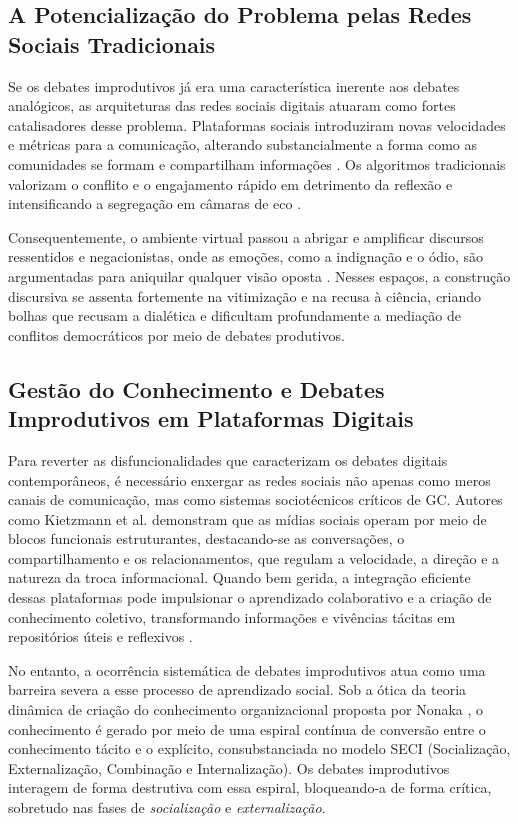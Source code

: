 \documentclass[conference]{IEEEtran} \IEEEoverridecommandlockouts %
\begin{document}
\subsection{A Potencialização do Problema pelas Redes Sociais Tradicionais}

Se os debates improdutivos já era uma característica inerente aos debates analógicos, as arquiteturas das redes sociais digitais atuaram como fortes catalisadores desse problema. Plataformas sociais introduziram novas velocidades e métricas para a comunicação, alterando substancialmente a forma como as comunidades se formam e compartilham informações \cite{kietzmannSocialMediaGet2011,schneider2026mitigating}. Os algoritmos tradicionais valorizam o conflito e o engajamento rápido em detrimento da reflexão e intensificando a segregação em câmaras de eco \cite{pimentelAgendaSolutionsMitigate2023}.

Consequentemente, o ambiente virtual passou a abrigar e amplificar discursos ressentidos e negacionistas, onde as emoções, como a indignação e o ódio, são argumentadas para aniquilar qualquer visão oposta \cite{lima2020discursos}. Nesses espaços, a construção discursiva se assenta fortemente na vitimização e na recusa à ciência, criando bolhas que recusam a dialética e dificultam profundamente a mediação de conflitos democráticos por meio de debates produtivos.

\subsection{Gestão do Conhecimento e Debates Improdutivos em Plataformas Digitais}


Para reverter as disfuncionalidades que caracterizam os debates digitais contemporâneos, é necessário enxergar as redes sociais não apenas como meros canais de comunicação, mas como sistemas sociotécnicos críticos de GC. Autores como Kietzmann et al. \cite{kietzmannSocialMediaGet2011} demonstram que as mídias sociais operam por meio de blocos funcionais estruturantes, destacando-se as conversações, o compartilhamento e os relacionamentos, que regulam a velocidade, a direção e a natureza da troca informacional. Quando bem gerida, a integração eficiente dessas plataformas pode impulsionar o aprendizado colaborativo e a criação de conhecimento coletivo, transformando informações e vivências tácitas em repositórios úteis e reflexivos \cite{oktaviaConceptualModelKnowledge2017}. 

No entanto, a ocorrência sistemática de debates improdutivos atua como uma barreira severa a esse processo de aprendizado social. Sob a ótica da teoria dinâmica de criação do conhecimento organizacional proposta por Nonaka \cite{nonaka1994dynamic}, o conhecimento é gerado por meio de uma espiral contínua de conversão entre o conhecimento tácito e o explícito, consubstanciada no modelo SECI (Socialização, Externalização, Combinação e Internalização). Os debates improdutivos interagem de forma destrutiva com essa espiral, bloqueando-a de forma crítica, sobretudo nas fases de \textit{socialização} e \textit{externalização}. 
\end{document}
